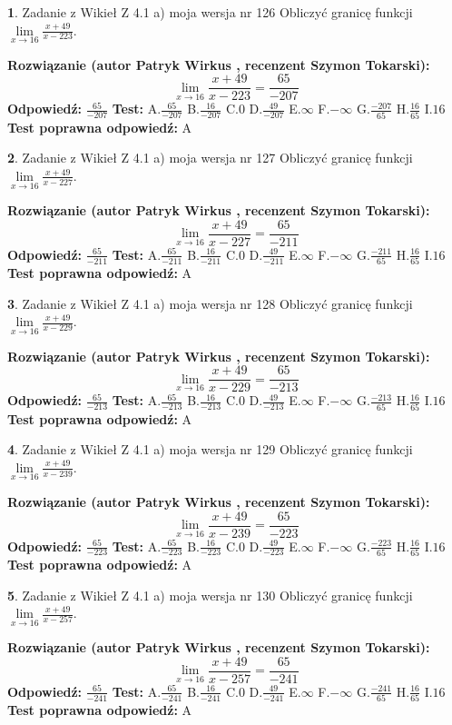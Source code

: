 \documentclass[12pt, a4paper]{article}
\theoremstyle{definition} %
\newtheorem{zad}{}
\newcommand{\zadStart}[1]{\begin{zad}#1\newline}
\newcommand{\zadStop}{\end{zad}}
\newcommand{\rozwStart}[2]{\noindent \textbf{Rozwiązanie (autor #1 , recenzent #2): }\newline}
\newcommand{\rozwStop}{\newline}
\newcommand{\odpStart}{\noindent \textbf{Odpowiedź:}\newline}
\newcommand{\odpStop}{\newline}
\newcommand{\testStart}{\noindent \textbf{Test:}\newline}
\newcommand{\testStop}{\newline}
\newcommand{\kluczStart}{\noindent \textbf{Test poprawna odpowiedź:}\newline}
\newcommand{\kluczStop}{\newline}
\begin{document}
\zadStart{Zadanie z Wikieł Z 4.1 a) moja wersja nr 126}
Obliczyć granicę funkcji $\lim\limits_{x\to16}\frac{x+49}{x-223}$.
\zadStop
\rozwStart{Patryk Wirkus}{Szymon Tokarski}
$$\lim\limits_{x\to16}\frac{x+49}{x-223} = \frac{65}{-207}$$
\rozwStop
\odpStart
$\frac{65}{-207}$
\odpStop
\testStart
A.$\frac{65}{-207}$
B.$\frac{16}{-207}$
C.$0$
D.$\frac{49}{-207}$
E.$\infty$
F.$-\infty$
G.$\frac{-207}{65}$
H.$\frac{16}{65}$
I.$16$
\testStop
\kluczStart
A
\kluczStop



\zadStart{Zadanie z Wikieł Z 4.1 a) moja wersja nr 127}
Obliczyć granicę funkcji $\lim\limits_{x\to16}\frac{x+49}{x-227}$.
\zadStop
\rozwStart{Patryk Wirkus}{Szymon Tokarski}
$$\lim\limits_{x\to16}\frac{x+49}{x-227} = \frac{65}{-211}$$
\rozwStop
\odpStart
$\frac{65}{-211}$
\odpStop
\testStart
A.$\frac{65}{-211}$
B.$\frac{16}{-211}$
C.$0$
D.$\frac{49}{-211}$
E.$\infty$
F.$-\infty$
G.$\frac{-211}{65}$
H.$\frac{16}{65}$
I.$16$
\testStop
\kluczStart
A
\kluczStop



\zadStart{Zadanie z Wikieł Z 4.1 a) moja wersja nr 128}
Obliczyć granicę funkcji $\lim\limits_{x\to16}\frac{x+49}{x-229}$.
\zadStop
\rozwStart{Patryk Wirkus}{Szymon Tokarski}
$$\lim\limits_{x\to16}\frac{x+49}{x-229} = \frac{65}{-213}$$
\rozwStop
\odpStart
$\frac{65}{-213}$
\odpStop
\testStart
A.$\frac{65}{-213}$
B.$\frac{16}{-213}$
C.$0$
D.$\frac{49}{-213}$
E.$\infty$
F.$-\infty$
G.$\frac{-213}{65}$
H.$\frac{16}{65}$
I.$16$
\testStop
\kluczStart
A
\kluczStop



\zadStart{Zadanie z Wikieł Z 4.1 a) moja wersja nr 129}
Obliczyć granicę funkcji $\lim\limits_{x\to16}\frac{x+49}{x-239}$.
\zadStop
\rozwStart{Patryk Wirkus}{Szymon Tokarski}
$$\lim\limits_{x\to16}\frac{x+49}{x-239} = \frac{65}{-223}$$
\rozwStop
\odpStart
$\frac{65}{-223}$
\odpStop
\testStart
A.$\frac{65}{-223}$
B.$\frac{16}{-223}$
C.$0$
D.$\frac{49}{-223}$
E.$\infty$
F.$-\infty$
G.$\frac{-223}{65}$
H.$\frac{16}{65}$
I.$16$
\testStop
\kluczStart
A
\kluczStop



\zadStart{Zadanie z Wikieł Z 4.1 a) moja wersja nr 130}
Obliczyć granicę funkcji $\lim\limits_{x\to16}\frac{x+49}{x-257}$.
\zadStop
\rozwStart{Patryk Wirkus}{Szymon Tokarski}
$$\lim\limits_{x\to16}\frac{x+49}{x-257} = \frac{65}{-241}$$
\rozwStop
\odpStart
$\frac{65}{-241}$
\odpStop
\testStart
A.$\frac{65}{-241}$
B.$\frac{16}{-241}$
C.$0$
D.$\frac{49}{-241}$
E.$\infty$
F.$-\infty$
G.$\frac{-241}{65}$
H.$\frac{16}{65}$
I.$16$
\testStop
\kluczStart
A
\kluczStop
\end{document}
